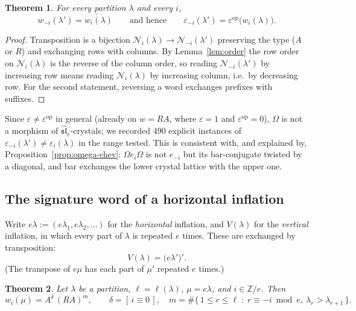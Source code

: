 \documentclass[11pt]{article}
\theoremstyle{plain}
\newtheorem{theorem}{Theorem}
\theoremstyle{definition}
\newcommand{\Om}{\Omega}
\begin{document}
\begin{theorem}\label{thm:eps-transpose}
For every partition $\lambda$ and every $i$,
\[
  w_{-i}(\lambda')=\overleftarrow{w_i(\lambda)}
  \qquad\text{and hence}\qquad
  \varepsilon_{-i}(\lambda')=\varepsilon^{\mathrm{op}}\bigl(w_i(\lambda)\bigr).
\]
\end{theorem}
\begin{proof}
Transposition is a bijection $\mathcal{N}_i(\lambda)\to
\mathcal{N}_{-i}(\lambda')$ preserving the type ($A$ or $R$) and exchanging
rows with columns.  By Lemma~\ref{lem:order} the row order on
$\mathcal{N}_i(\lambda)$ is the reverse of the column order, so reading
$\mathcal{N}_{-i}(\lambda')$ by increasing row means reading
$\mathcal{N}_i(\lambda)$ by increasing column, i.e.\ by decreasing row.  For
the second statement, reversing a word exchanges prefixes with suffixes.
\end{proof}

Since $\varepsilon\ne\varepsilon^{\mathrm{op}}$ in general (already on
$w=RA$, where $\varepsilon=1$ and $\varepsilon^{\mathrm{op}}=0$), $\Om$ is not
a morphism of $\widehat{\mathfrak{sl}}_e$-crystals; we recorded $490$ explicit
instances of $\varepsilon_{-i}(\lambda')\ne\varepsilon_i(\lambda)$ in the
range tested.  This is consistent with, and explained by,
Proposition~\ref{prop:omega-chev}: $\Om e_i\Om$ is not $e_{-i}$ but its
bar-conjugate twisted by a diagonal, and bar exchanges the lower crystal
lattice with the upper one.

\subsection{The signature word of a horizontal inflation}

Write $e\lambda:=(e\lambda_1,e\lambda_2,\dots)$ for the \emph{horizontal}
inflation, and $V(\lambda)$ for the \emph{vertical} inflation, in which every
part of $\lambda$ is repeated $e$ times.  These are exchanged by
transposition:
\begin{equation}\label{eq:HV}
  V(\lambda)=\bigl(e\lambda'\bigr)' .
\end{equation}
(The transpose of $e\mu$ has each part of $\mu'$ repeated $e$ times.)

\begin{theorem}\label{thm:word}
Let $\lambda$ be a partition, $\ell=\ell(\lambda)$, $\mu=e\lambda$, and
$i\in\mathbb{Z}/e$.  Then
\[
  w_i(\mu)=A^{\delta}\,(RA)^{m},
  \qquad
  \delta=[\,i\equiv0\,],\quad
  m=\#\{\,1\le r\le\ell \;:\; r\equiv-i \bmod e,\ \lambda_r>\lambda_{r+1}\,\}.
\]
\end{theorem}
\end{document}
